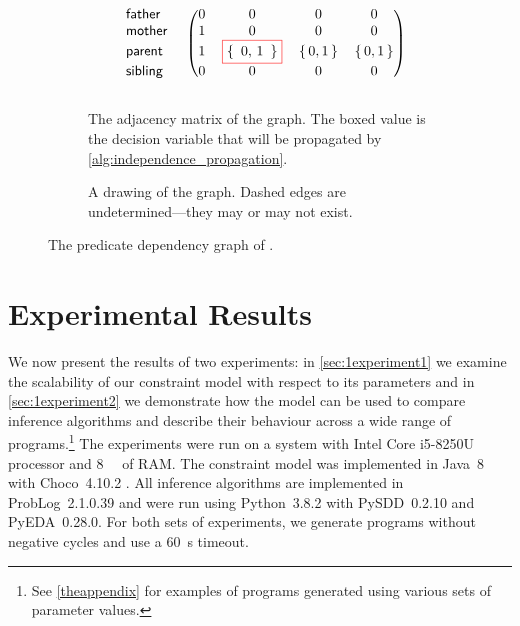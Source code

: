 \begin{figure}[t]
  \begin{subfigure}[b]{0.59\textwidth}
    \centering
    \[
    \begin{blockarray}{lcccc}
      \begin{block}{l!{\quad}(cccc)}
        \mathsf{father} & 0 & 0 & 0 & 0 \\
        \mathsf{mother} & 1 & 0 & 0 & 0 \\
        \mathsf{parent} & 1 & \fbox{\{\, 0, 1 \,\}} & \{\, 0, 1 \,\} & \{\, 0, 1 \,\} \\
        \mathsf{sibling} & 0 & 0 & 0 & 0 \\
      \end{block}
    \end{blockarray}
    \]
    \vspace{-1cm}
    \caption{The adjacency matrix of the graph. The boxed value is the decision
      variable that will be propagated by
      \cref{alg:independence_propagation}.}\label{fig:dependencies_matrix}
  \end{subfigure}%
  \hfill
  \begin{subfigure}[b]{.39\textwidth}
    \centering
    \caption{A drawing of the graph. Dashed edges are undetermined---they may or
      may not exist.}\label{fig:dependencies2}
  \end{subfigure}
  \caption{The predicate dependency graph of
    .}\label{fig:example}
\end{figure}

\section{Experimental Results}\label{sec:1experiments}

We now present the results of two experiments: in \cref{sec:1experiment1} we
examine the scalability of our constraint model with respect to its parameters
and in \cref{sec:1experiment2} we demonstrate how the model can be used to
compare inference algorithms and describe their behaviour across a wide range of
programs.\footnote{See \cref{theappendix} for examples of programs generated
  using various sets of parameter values.} The experiments were run on a system
with Intel Core i5-8250U processor and \SI{8}{\giga\byte} of RAM\@. The
constraint model was implemented in Java~8 with Choco~4.10.2 \citep{choco}. All
inference algorithms are implemented in ProbLog~2.1.0.39 and were run using
Python~3.8.2 with PySDD~0.2.10 and PyEDA~0.28.0. For both sets of experiments,
we generate programs without negative cycles and use a \SI{60}{\second} timeout.

